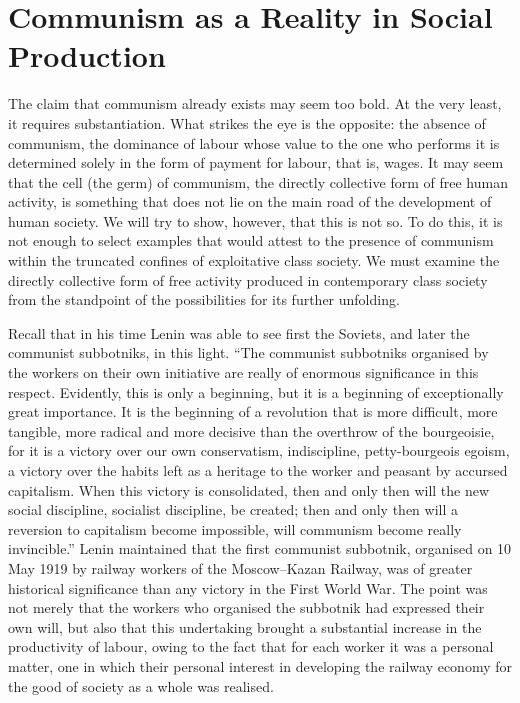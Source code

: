 \documentclass[../main]{subfiles}
\begin{document}
\ifSubfilesClassLoaded{\setcounter{page}{19}}{}
\section{Communism as a Reality in Social Production}
\label{sec:04_communism_reality}

The claim that communism already exists may seem too bold. At the very least, it requires substantiation. What strikes the eye is the opposite: the absence of communism, the dominance of labour whose value to the one who performs it is determined solely in the form of payment for labour, that is, wages. It may seem that the cell (the germ) of communism, the directly collective form of free human activity, is something that does not lie on the main road of the development of human society. We will try to show, however, that this is not so. To do this, it is not enough to select examples that would attest to the presence of communism within the truncated confines of exploitative class society. We must examine the directly collective form of free activity produced in contemporary class society from the standpoint of the possibilities for its further unfolding.

Recall that in his time Lenin was able to see first the Soviets, and later the communist subbotniks, in this light. “The communist subbotniks organised by the workers on their own initiative are really of enormous significance in this respect. Evidently, this is only a beginning, but it is a beginning of exceptionally great importance. It is the beginning of a revolution that is more difficult, more tangible, more radical and more decisive than the overthrow of the bourgeoisie, for it is a victory over our own conservatism, indiscipline, petty-bourgeois egoism, a victory over the habits left as a heritage to the worker and peasant by accursed capitalism. When this victory is consolidated, then and only then will the new social discipline, socialist discipline, be created; then and only then will a reversion to capitalism become impossible, will communism become really invincible.” Lenin maintained that the first communist subbotnik, organised on 10 May 1919 by railway workers of the Moscow–Kazan Railway, was of greater historical significance than any victory in the First World War. The point was not merely that the workers who organised the subbotnik had expressed their own will, but also that this undertaking brought a substantial increase in the productivity of labour, owing to the fact that for each worker it was a personal matter, one in which their personal interest in developing the railway economy for the good of society as a whole was realised.
\end{document}
